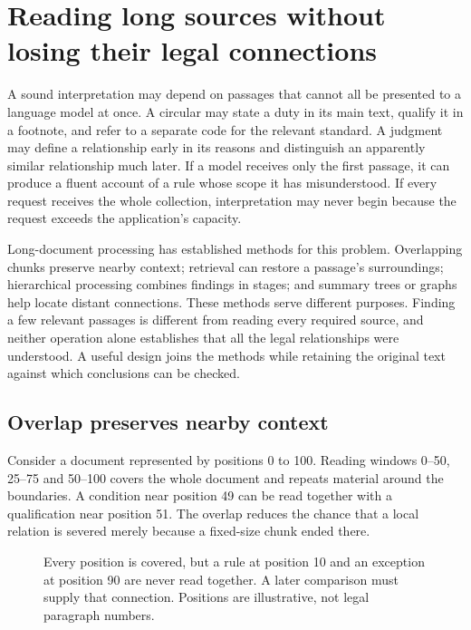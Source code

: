 \section{Reading long sources without losing their legal connections}
\label{sec:bounded-legal-context}

A sound interpretation may depend on passages that cannot all be presented
to a language model at once. A circular may state a duty in its main text,
qualify it in a footnote, and refer to a separate code for the relevant
standard. A judgment may define a relationship early in its reasons and
distinguish an apparently similar relationship much later. If a model
receives only the first passage, it can produce a fluent account of a rule
whose scope it has misunderstood. If every request receives the whole
collection, interpretation may never begin because the request exceeds
the application's capacity.

Long-document processing has established methods for this problem.
Overlapping chunks preserve nearby context; retrieval can restore a
passage's surroundings; hierarchical processing combines findings in stages;
and summary trees or graphs help locate distant connections. These methods
serve different purposes. Finding a few relevant passages is different from
reading every required source, and neither operation alone establishes that
all the legal relationships were understood. A useful design joins the
methods while retaining the original text against which conclusions can be
checked.

\subsection{Overlap preserves nearby context}

Consider a document represented by positions 0 to 100. Reading windows
0--50, 25--75 and 50--100 covers the whole document and repeats material
around the boundaries. A condition near position 49 can be read together
with a qualification near position 51. The overlap reduces the chance that
a local relation is severed merely because a fixed-size chunk ended there.

\begin{figure}[htbp]
\centering
{}
\caption{Every position is covered, but a rule at position 10 and an
exception at position 90 are never read together. A later comparison must
supply that connection. Positions are illustrative, not legal paragraph numbers.}
\label{fig:legal-overlap}
\end{figure}

